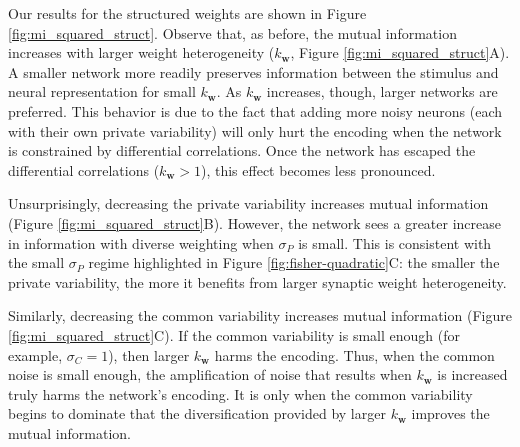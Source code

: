 \documentclass[12pt]{article}
\begin{document}
Our results for the structured weights are shown in Figure \ref{fig:mi_squared_struct}. Observe that, as before, the mutual information increases with larger weight heterogeneity ($k_{\mathbf{w}}$, Figure \ref{fig:mi_squared_struct}A). A smaller network more readily preserves information between the stimulus and neural representation for small $k_{\mathbf{w}}$. As $k_{\mathbf{w}}$ increases, though, larger networks are preferred. This behavior is due to the fact that adding more noisy neurons (each with their own private variability) will only hurt the encoding when the network is constrained by differential correlations. Once the network has escaped the differential correlations ($k_{\mathbf{w}} > 1$), this effect becomes less pronounced.
	
Unsurprisingly, decreasing the private variability increases mutual information (Figure \ref{fig:mi_squared_struct}B). However, the network sees a greater increase in information with diverse weighting when $\sigma_P$ is small. This is consistent with the small $\sigma_P$ regime highlighted in Figure \ref{fig:fisher-quadratic}C: the smaller the private variability, the more it benefits from larger synaptic weight heterogeneity. 
	
Similarly, decreasing the common variability increases mutual information (Figure \ref{fig:mi_squared_struct}C). If the common variability is small enough (for example, $\sigma_C=1$), then larger $k_{\mathbf{w}}$ harms the encoding. Thus, when the common noise is small enough, the amplification of noise that results when $k_{\mathbf{w}}$ is increased truly harms the network's encoding. It is only when the common variability begins to dominate that the diversification provided by larger $k_{\mathbf{w}}$ improves the mutual information. 
\end{document}
